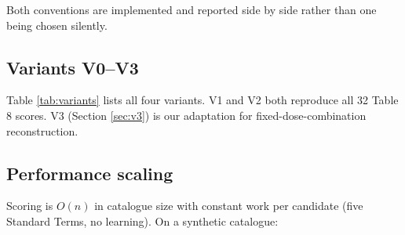 \documentclass[12pt,twocolumn,a4paper]{elsarticle}
\begin{document}
Both conventions are implemented and reported side by side rather than one being chosen silently.

\subsection{Variants V0--V3}
\label{sec:results-variants}

\begin{table}[htbp]
\centering\small
\caption{Variant summary. V3 is our MediGen fixed-dose-combination composite extension; it is not evaluated against published ground truth because the specification publishes no FC DS score.}
\label{tab:variants}
\end{table}

Table \ref{tab:variants} lists all four variants. V1 and V2 both reproduce all 32 Table 8 scores. V3 (Section \ref{sec:v3}) is our adaptation for fixed-dose-combination reconstruction.

\subsection{Performance scaling}
\label{sec:results-scaling}

Scoring is $O(n)$ in catalogue size with constant work per candidate (five Standard Terms, no learning). On a synthetic catalogue:

\begin{table}[htbp]
\centering\small
\caption{Runtime and memory scaling of the scoring algorithm. Synthetic catalogue; no accuracy claimed.}
\label{tab:scaling}
\end{table}
\end{document}
